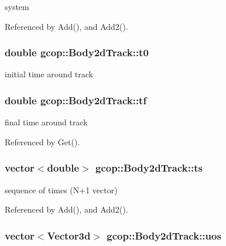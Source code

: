 system 



\-Referenced by \-Add(), and \-Add2().

\subsubsection[{t0}]{\setlength{\rightskip}{0pt plus 5cm}double {\bf gcop\-::\-Body2d\-Track\-::t0}}\label{classgcop_1_1Body2dTrack_a769a9f5dd668c0672ca3df8e97a7939d}


initial time around track 

\subsubsection[{tf}]{\setlength{\rightskip}{0pt plus 5cm}double {\bf gcop\-::\-Body2d\-Track\-::tf}}\label{classgcop_1_1Body2dTrack_a6465d82716194683bc5fcb95e7c0220b}


final time around track 



\-Referenced by \-Get().

\subsubsection[{ts}]{\setlength{\rightskip}{0pt plus 5cm}vector$<$double$>$ {\bf gcop\-::\-Body2d\-Track\-::ts}}\label{classgcop_1_1Body2dTrack_a851a8e990305a8b06c1d21ef457f699c}


sequence of times (\-N+1 vector) 



\-Referenced by \-Add(), and \-Add2().

\subsubsection[{uos}]{\setlength{\rightskip}{0pt plus 5cm}vector$<$\-Vector3d$>$ {\bf gcop\-::\-Body2d\-Track\-::uos}}\label{classgcop_1_1Body2dTrack_a4098647c1bb6150ab0ac560871eabbbf}


